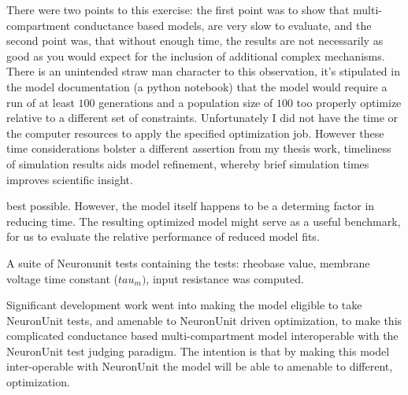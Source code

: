 
There were two points to this exercise: the first point was to show that multi-compartment conductance based models, are very slow to evaluate, and the second point was, that without enough time, the results are not necessarily as good as you would expect for the inclusion of additional complex mechanisms. There is an unintended straw man character to this observation, it's stipulated in the model documentation (a python notebook) that the model would require a run of at least $100$ generations and a population size of $100$ too properly optimize relative to a different set of constraints. Unfortunately I did not have the time or the computer resources to apply the specified optimization job. However these time considerations bolster a different assertion from my thesis work, timeliness of simulation results aids model refinement, whereby brief simulation times improves scientific insight.

best possible.
However, the model itself happens to be a determing factor in reducing time. The resulting optimized model might serve as a useful benchmark, for us to evaluate the relative performance of reduced model fits. 

A suite of Neuronunit tests containing the tests: rheobase value, membrane voltage time constant ($tau_{m})$, input resistance was computed. 

Significant development work went into making the model eligible to take NeuronUnit tests, and amenable to NeuronUnit driven optimization, to make this complicated conductance based multi-compartment model interoperable with the NeuronUnit test judging paradigm.
The intention is that by making this model inter-operable with NeuronUnit the model will be able to amenable to different, optimization. 

